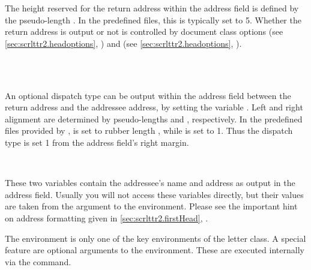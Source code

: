 The height reserved for the return address within the address field is
defined by the pseudo-length . In the
predefined  files, this is typically set to
5. Whether the return address is output or not is controlled
by document class options  (see
\autoref{sec:scrlttr2.headoptions},
) and  (see \autoref{sec:scrlttr2.headoptions},
).
%
%
%


\begin{Declaration}
  \\
  \\
\end{Declaration}
%
%
%
An optional dispatch type can be output within the address field
between the return address and the addressee address, by setting the
variable . Left and right alignment are
determined by pseudo-lengths  and
, respectively. In the predefined
 files provided by \KOMAScript, 
is set to rubber length , while
 is set to 1. Thus the
dispatch type is set 1 from the address field's right margin.
%
%
%
%


\begin{Declaration}
  \\
\end{Declaration}
%
%
These two variables contain the addressee's name and address as output
in the address field. Usually you will not access these variables
directly, but their values are taken from the argument to the
 environment. Please see the
important hint on address formatting given in
\autoref{sec:scrlttr2.firstHead},
.
%
%
%


\begin{Declaration}
\end{Declaration}
%
The  environment is only one of the key
environments of the letter class. A special  feature
are optional arguments to the  environment. These
 are executed internally via the 
command.

